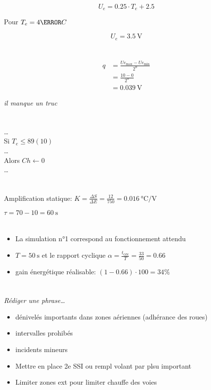 \documentclass{article}
\begin{document}
\[
	U_e = 0.25 \cdot T_e + 2.5
\] 

Pour $T_e = 4\degree C$

\[
	U_e = \SI{3.5}{\volt}
\] 

\section{}
\begin{align*}
	q &= \frac{Ue_\text{max}-Ue_\text{min}}{2^{n}} \\
	  &= \frac{10-0}{2^{n}} \\
	  &= \SI{0.039}{\volt}
\end{align*}

\emph{il manque un truc} 

\section{}

\ldots \\
Si $T_e \leq 89(10)$ \\
\ldots \\
Alors $Ch \leftarrow 0$ \\
\ldots

\section{}
Amplification statique: $K = \frac{\Delta S}{\Delta E} = \frac{12}{750} = \SI{0.016}{\celsius\per\volt}$

$\tau = 70 - 10 = \SI{60}{\second}$

\section{}

\begin{itemize}
	\item La simulation n°1 correspond au fonctionnement attendu
	\item $T = \SI{50}{\second}$ et le rapport cyclique $\alpha=\frac{t_\text{ON}}{T} = \frac{33}{50} = 0.66$ 
	\item gain énergétique réalisable: $(1-0.66) \cdot 100 = 34\%$

\end{itemize}

\section{}
\emph{Rédiger une phrase\ldots} 
\begin{itemize}
	\item dénivelés importants dans zones aériennes (adhérance des roues)
	\item intervalles prohibés
	\item incidents mineurs
	\item Mettre en place 2e SSI ou rempl volant par plsu important
	\item Limiter zones ext pour limiter chauffe des voies
\end{itemize}
\end{document}
